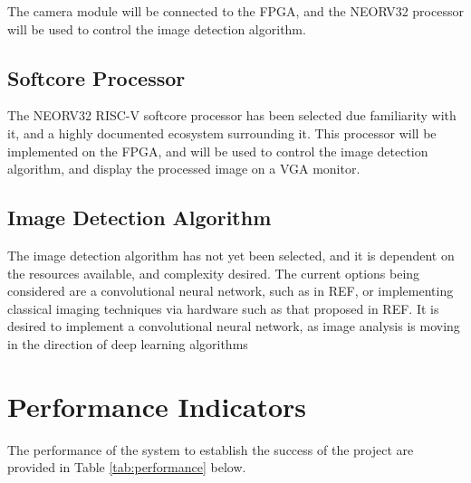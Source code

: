 The camera module will be connected to the FPGA, and the NEORV32 processor will be used to control the image detection algorithm.

\subsection{Softcore Processor}
The NEORV32 RISC-V softcore processor has been selected due familiarity with it, and a highly documented ecosystem surrounding it. 
This processor will be implemented on the FPGA, and will be used to control the image detection algorithm, and display the processed image on a VGA monitor.

\subsection{Image Detection Algorithm}
The image detection algorithm has not yet been selected, and it is dependent on the resources available, and complexity desired.
The current options being considered are a convolutional neural network, such as in REF, or implementing classical imaging techniques via hardware such as that proposed in REF.
It is desired to implement a convolutional neural network, as image analysis is moving in the direction of deep learning algorithms \cite{DCNN}

\section{Performance Indicators}
The performance of the system to establish the success of the project are provided in Table \ref{tab:performance} below.


